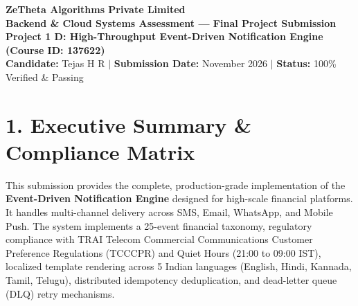 \documentclass[11pt,a4paper]{article}
\begin{document}
\begin{center}
    {\LARGE \textbf{\color{primary}ZeTheta Algorithms Private Limited}}\\[4pt]
    {\large \textbf{Backend \& Cloud Systems Assessment — Final Project Submission}}\\[2pt]
    \textbf{Project 1 D: High-Throughput Event-Driven Notification Engine (Course ID: 137622)}\\[3pt]
    \textbf{Candidate:} Tejas H R \quad $|$ \quad \textbf{Submission Date:} November 2026 \quad $|$ \quad \textbf{Status:} 100\% Verified \& Passing
\end{center}

\vspace{6pt}

\section{1. Executive Summary \& Compliance Matrix}
This submission provides the complete, production-grade implementation of the \textbf{Event-Driven Notification Engine} designed for high-scale financial platforms. It handles multi-channel delivery across SMS, Email, WhatsApp, and Mobile Push. The system implements a 25-event financial taxonomy, regulatory compliance with TRAI Telecom Commercial Communications Customer Preference Regulations (TCCCPR) and Quiet Hours (21:00 to 09:00 IST), localized template rendering across 5 Indian languages (English, Hindi, Kannada, Tamil, Telugu), distributed idempotency deduplication, and dead-letter queue (DLQ) retry mechanisms.
\end{document}
